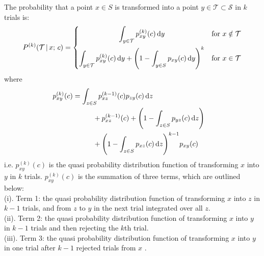 \begin{definition}
The probability that a point $x \in S$ is transformed into a point $y \in \mathcal{T} \subset \mathcal{S}$ in $k$ trials is:\\
\begin{equation}
    P^{(k)}(\mathcal{T} \, | \, x; \, c) = \begin{dcases}
        \hfil \int_{y \in \mathcal{T}} p^{(k)}_{xy}(c) \, \dd y & \text{for } x \notin \mathcal{T} \\
        \int_{y \in \mathcal{T}} p^{(k)}_{xy}(c) \, \dd y + \Bigg( 1 - \int_{y \in S} p_{xy}(c) \, \dd y \Bigg)^{k} & \text{for } x \in \mathcal{T} \\
    \end{dcases}
\end{equation}
where
\begin{align}
    p^{(k)}_{xy}(c) &=\int_{z \in S} p^{(k-1)}_{xz}(c)p_{zy}(c) \, \dd z & \notag \\
    & \hspace{10mm} +p^{(k-1)}_{xz}(c) + \Bigg( 1 - \int_{z \in S} p_{yz}(c) \, \dd z \Bigg) & \notag \\
    & \hspace{10mm} + \Bigg( 1 - \int_{z \in S} p_{xz}(c) \, \dd z \Bigg)^{k-1}p_{xy}(c) 
\end{align}
i.e. $p^{(k)}_{xy}(c)$ is the quasi probability distribution function of transforming $x$ into $y$ in $k$ trials. $p^{(k)}_{xy}(c)$ is the summation of three terms, which are outlined below:\\
(i). Term 1: the quasi probability distribution function of transforming $x$ into $z$ in $k-1$ trials, and from $z$ to $y$ in the next trial integrated over all $z$. \\
(ii). Term 2: the quasi probability distribution function of transforming $x$ into $y$ in $k-1$ trials and then rejecting the $k$th trial. \\
(iii). Term 3: the quasi probability distribution function of transforming $x$ into $y$ in one trial after $k-1$ rejected trials from $x$ \cite{dekkers}.
\end{definition}


